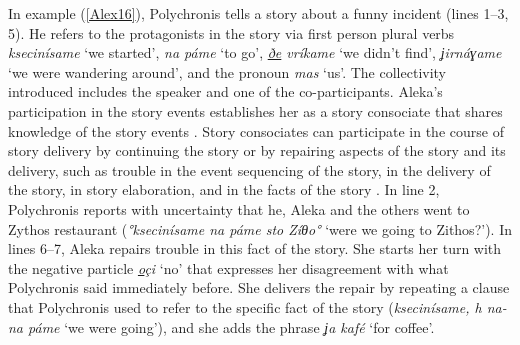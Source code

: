 \documentclass[output=paper]{LSP/langsci}
\begin{document}
In example (\ref{Alex16}), Polychronis tells a story about a funny incident (lines 1--3, 5). He refers to the protagonists in the story via first person plural verbs \textit{ksecinísame} `we started', \textit{na páme} `to go', \textit{\underline{ðe} vríkame} `we didn’t find', \textit{ʝirnáɣame} `we were wandering around', and the pronoun \textit{mas} `us'. The collectivity introduced includes the speaker and one of the co-participants. Aleka’s participation in the story events establishes her as a story consociate that shares knowledge of the story events \citep{Lerner92}. Story consociates can participate in the course of story delivery by continuing the story or by repairing aspects of the story and its delivery, such as trouble in the event sequencing of the story, in the delivery of the story, in story elaboration, and in the facts of the story \citep{Lerner92}. In line 2, Polychronis reports with uncertainty that he, Aleka and the others went to Zythos restaurant (\textit{°ksecinísame na páme sto Zíθo°} `were we going to Zithos?'). In lines 6--7, Aleka repairs trouble in this fact of the story. She starts her turn with the negative particle \textit{\underline{o}çi} `no' that expresses her disagreement with what Polychronis said immediately before. She delivers the repair by repeating a clause that Polychronis used to refer to the specific fact of the story (\textit{ksecinísame, h na- na páme} `we were going'), and she adds the phrase \textit{ʝa kafé} `for coffee'. 
\end{document}
